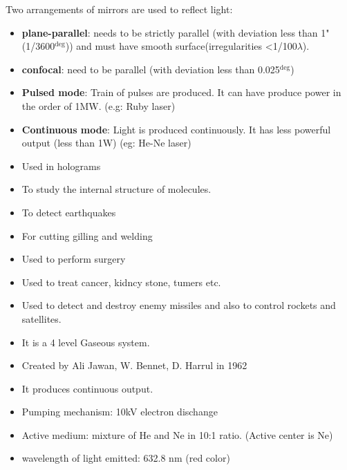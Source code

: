 \documentclass[12pt, a4paper]{article}
\begin{document}
Two arrangements of mirrors are used to reflect light:
\begin{itemize}
	\item \textbf{plane-parallel}: needs to be strictly parallel (with deviation less than 1" (1/3600$^{\deg}$)) and must have smooth surface(irregularities <1/100$\lambda$).
	\item \textbf{confocal}: need to be parallel (with deviation less than 0.025$^{\deg}$)
\end{itemize}



\begin{itemize}
	\item \textbf{Pulsed mode}: Train of pulses are produced. It can have produce power in the order of 1MW. (e.g: Ruby laser)
	\item \textbf{Continuous mode}: Light is produced continuously. It has less powerful output (less than 1W) (eg: He-Ne laser)
\end{itemize}


\begin{itemize}
	\item Used in holograms
	\item To study the internal structure of molecules.
	\item To detect earthquakes
	\item For cutting gilling and welding
	\item Used to perform surgery
	\item Used to treat cancer, kidncy stone, tumers etc.
	\item Used to detect and destroy enemy missiles and also to control rockets and satellites.
\end{itemize}


\begin{itemize}
	\item It is a 4 level Gaseous system.
	\item Created by Ali Jawan, W. Bennet, D. Harrul in 1962
	\item It produces continuous output.
	\item Pumping mechanism: 10kV electron dischange
	\item Active medium: mixture of He and Ne in 10:1 ratio. (Active center is Ne)
	\item wavelength of light emitted: 632.8 nm (red color)
\end{itemize}
\end{document}
